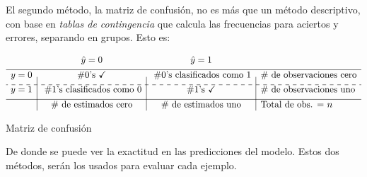 \documentclass[../Main/Main.tex]{subfiles}
\begin{document}
El segundo método, la matriz de confusión, no es más que un método descriptivo, con base en \textit{tablas de contingencia} que calcula las frecuencias para aciertos y errores, separando en grupos. Esto es:
\begin{table}[H]
\centering
$\begin{array}{c|c|c|l}
~ & \hat{y} = 0 & \hat{y} = 1 & ~ \\[4pt]
\hline
y = 0 & \# 0\text{'s } \checkmark  & \;\# 0\text{'s clasificados como }1 & \#\text{ de observaciones cero} \\[4pt]
\cdashline{1-4}
y = 1 & \;\# 1\text{'s clasificados como }0 & \# 1\text{'s } \checkmark & \#\text{ de observaciones uno} \\[4pt]
\hline
~ & \# \text{ de estimados cero} & \# \text{ de estimados uno} &  \text{Total de obs. = } n
\end{array}$
\caption*{Matriz de confusión}
\label{tab:MatrizConfusion}
\end{table}

De donde se puede ver la exactitud en las predicciones del modelo. Estos dos métodos, serán los usados para evaluar cada ejemplo. 
\end{document}

